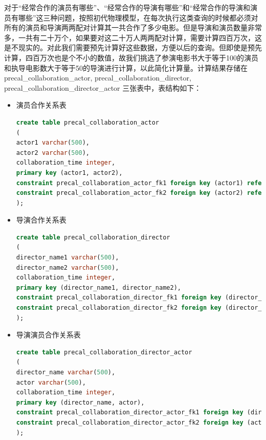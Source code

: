 \documentclass{ctexrep}
\begin{document}
\begin{enumerate}
\begin{itemize}
        \end{itemize}
        对于“经常合作的演员有哪些”、“经常合作的导演有哪些”和“经常合作的导演和演员有哪些”这三种问题，按照初代物理模型，在每次执行这类查询的时候都必须对所有的演员和导演两两配对计算其一共合作了多少电影。但是导演和演员数量非常多，一共有二十万个，如果要对这二十万人两两配对计算，需要计算四百万次，这是不现实的。对此我们需要预先计算好这些数据，方便以后的查询。但即使是预先计算，四百万次也是个不小的数值，故我们挑选了参演电影书大于等于100的演员和执导电影数大于等于50的导演进行计算，以此简化计算量。计算结果存储在 precal\_collaboration\_actor, precal\_collaboration\_director, precal\_collaboration\_director\_actor 三张表中，表结构如下：
        \begin{itemize}
            \item 演员合作关系表
                \begin{lstlisting}[language=sql]
create table precal_collaboration_actor
(
actor1 varchar(500),
actor2 varchar(500),
collaboration_time integer,
primary key (actor1, actor2),
constraint precal_collaboration_actor_fk1 foreign key (actor1) references prejoin_movie_actor(actor),
constraint precal_collaboration_actor_fk2 foreign key (actor2) references prejoin_movie_actor(actor)
);
                \end{lstlisting}
            \item 导演合作关系表
                \begin{lstlisting}[language=sql]
create table precal_collaboration_director
(
director_name1 varchar(500),
director_name2 varchar(500),
collaboration_time integer,
primary key (director_name1, director_name2),
constraint precal_collaboration_director_fk1 foreign key (director_name1) references prejoin_movie_director(director_name),
constraint precal_collaboration_director_fk2 foreign key (director_name2) references prejoin_movie_director(director_name)
);
                \end{lstlisting}
            \item 导演演员合作关系表
                \begin{lstlisting}[language=sql]
create table precal_collaboration_director_actor
(
director_name varchar(500),
actor varchar(500),
collaboration_time integer,
primary key (director_name, actor),
constraint precal_collaboration_director_actor_fk1 foreign key (director_name) references prejoin_movie_director(director_name),
constraint precal_collaboration_director_actor_fk2 foreign key (actor) references prejoin_movie_actor(actor)
);
                \end{lstlisting}

\end{itemize}
\end{enumerate}
\end{document}
